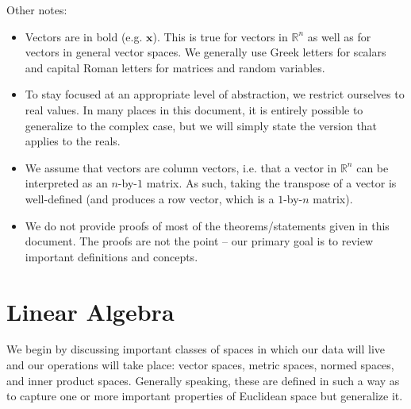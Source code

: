 \documentclass{article}
\newcommand{\R}{\mathbb{R}}
\renewcommand{\vec}[1]{\mathbf{#1}}
\begin{document}
\vspace{0.5cm}
Other notes:
\begin{itemize}
\item Vectors are in bold (e.g. $\vec{x}$). This is true for vectors in $\R^n$ as well as for vectors in general vector spaces. We generally use Greek letters for scalars and capital Roman letters for matrices and random variables.

\item To stay focused at an appropriate level of abstraction, we restrict ourselves to real values. In many places in this document, it is entirely possible to generalize to the complex case, but we will simply state the version that applies to the reals.

\item We assume that vectors are column vectors, i.e. that a vector in $\R^n$ can be interpreted as an $n$-by-$1$ matrix. As such, taking the transpose of a vector is well-defined (and produces a row vector, which is a $1$-by-$n$ matrix).

\item We do not provide proofs of most of the theorems/statements given in this document. The proofs are not the point -- our primary goal is to review important definitions and concepts.
\end{itemize}

\newpage
\section{Linear Algebra}
We begin by discussing important classes of spaces in which our data will live and our operations will take place: vector spaces, metric spaces, normed spaces, and inner product spaces. Generally speaking, these are defined in such a way as to capture one or more important properties of Euclidean space but generalize it.
\end{document}
